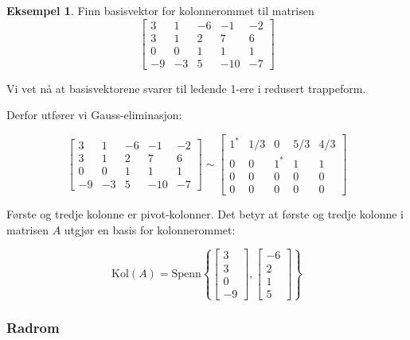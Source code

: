 \documentclass[11pt]{article}
\theoremstyle{definition}
\theoremstyle{definition}
\newtheorem{mitteks}{Eksempel}[section]
\theoremstyle{definition}
\theoremstyle{definition}
\theoremstyle{definition}
\theoremstyle{definition}
\begin{document}
		\begin{mitteks}
			Finn basisvektor for kolonnerommet til matrisen
			\[\left[\begin{array}{rrrrr} 
			3 & 1 & -6 & -1 & -2\\
			3 & 1 & 2 & 7   & 6\\
			0 & 0 & 1 & 1   & 1\\
			-9 & -3 & 5 & -10& -7
			\end{array} \right] \]
			
			Vi vet nå at basisvektorene svarer til ledende 1-ere i redusert trappeform.
			
			Derfor utfører vi Gauss-eliminasjon:
			
			\[\left[\begin{array}{rrrrr} 
			3 & 1 & -6 & -1 & -2\\
			3 & 1 & 2 & 7   & 6\\
			0 & 0 & 1 & 1   & 1\\
			-9 & -3 & 5 & -10& -7
			\end{array} \right]\sim
			\left[\begin{array}{ccccc} 
			1^* & 1/3 & 0 & 5/3 & 4/3\\
			0 & 0 & 1^* & 1   & 1\\
			0 & 0 & 0 & 0   & 0\\
			0 & 0 & 0 & 0 & 0
			\end{array} \right] \]
			
			Første og tredje kolonne er pivot-kolonner. Det betyr at første og tredje kolonne i matrisen \(A\) utgjør en basis for kolonnerommet:
			
			\[\text{Kol}(A)=\text{Spenn}\left\lbrace 
			\left[\begin{array}{r} 
			3 \\
			3 \\
			0 \\
			-9
			\end{array} \right],
			\left[\begin{array}{r} 
			-6 \\
			2 \\
			1 \\
			5
			\end{array} \right]
			\right\rbrace  \]
		\end{mitteks}
		
		\newpage
		
		\subsubsection{Radrom}
		
\end{document}
